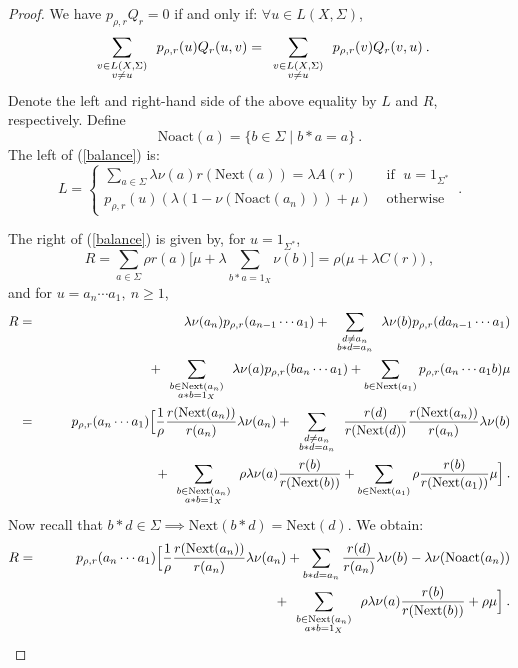 \documentclass[11pt,a4paper]{article}
\newcommand{\bdl}[2]
{\mbox{$
\renewcommand{\arraystretch}{0.5}
\begin{array}{c}{\scriptstyle #1}\\ {\scriptstyle #2} \end{array}
\renewcommand{\arraystretch}{2}
       $}}
\theoremstyle{remark}
\def\rig{\text{Next}}
\def\Noact{\text{Noact}}
\def\lef{\text{Next}}
\begin{document}
\begin{proof}
We have $p_{\rho,r} Q_r=0$ if and only if: $\forall u \in
L(X,\Sigma)$,
\begin{equation}\label{balance}
\sum_{\bdl{v\in L(X,\Sigma)}{v\neq u}} p_{\rho,r}(u) Q_r(u,v) =
\sum_{\bdl{v\in L(X,\Sigma)}{v\neq u}} p_{\rho,r}(v) Q_r(v,u) \:.
\end{equation}
Denote the left and right-hand side of the above equality by $L$
and $R$, respectively. Define
$$\Noact(a)=\{b \in \Sigma \mid b*a = a\} \ .$$
The left of (\ref{balance}) is:
\begin{equation}L=
\left\{\begin{array}{ll}
\sum_{a\in \Sigma}\lambda \nu(a) r(\rig(a))= \lambda A(r)\; & \text{if } \; u=1_{\Sigma^*} \\
p_{\rho,r}(u)(\lambda(1-\nu(\Noact(a_n))) + \mu) \; &
\mbox{otherwise }
\end{array}\right. \:.
\end{equation}

The right of (\ref{balance}) is given by, for $u=1_{\Sigma^*}$,
\begin{equation}
R = \sum_{a \in \Sigma} \rho r(a) \bigl[ \mu + \lambda \sum_{b\ast
a =1_X} \nu(b) \bigr] = \rho \bigl( \mu  + \lambda C(r) \bigr)\:,
\end{equation}
and for $u=a_n\cdots a_1, \ n\geq 1$,
\begin{eqnarray*}
R & = & \lambda \nu(a_n) p_{\rho,r}(a_{n-1}\cdots a_1) +
\sum_{\bdl {d \neq a_n}{b\ast d =a_n}}
\lambda \nu(b) p_{\rho,r}(da_{n-1}\cdots a_1) \\
&& \hspace*{0cm} + \sum_{\bdl {b\in \lef(a_n)}{a\ast b=1_X}}
\lambda \nu(a)p_{\rho,r}(ba_{n}\cdots a_1) + \sum_{b\in\rig(a_1)}
p_{\rho,r}(a_{n}\cdots a_1b)\mu \\
& = & p_{\rho,r}(a_n\cdots a_1) \Bigl[ \frac{1}{\rho}\frac
{r(\rig(a_n))}{r(a_n)}\lambda\nu(a_n) + \sum_{ \bdl {d\neq a_n}{b
\ast d=a_n}} \frac{r(d)}{r(\rig(d))}
\frac{r(\rig(a_n))}{r(a_n)} \lambda \nu(b) \Bigr. \\
&& \hspace*{3cm} \Bigl. + \sum_{\bdl{b\in \lef(a_n)}{a\ast b=1_X}}
\rho \lambda\nu(a) \frac {r(b)}{r(\rig(b))} + \sum_{b \in
\rig(a_1)} \rho \frac{r(b)}{r(\rig(a_1))} \mu \Bigr]\:.
\end{eqnarray*}
Now recall that  $b\ast d\in \Sigma \implies \rig(b*d)=\rig(d)$.
We obtain:
\begin{eqnarray*}
R & = & p_{\rho,r}(a_n\cdots a_1) \Bigl[ \frac{1}{\rho}\frac
{r(\rig(a_n))}{r(a_n)}\lambda\nu(a_n) + \sum_{b \ast d=a_n}
\frac{r(d)}{r(a_n)} \lambda
\nu(b) - \lambda\nu(\Noact(a_n)) \Bigr. \\
&& \hspace*{6cm} \Bigl. + \sum_{\bdl{b\in \lef(a_n)}{a\ast b=1_X}}
\rho \lambda\nu(a)\frac {r(b)}{r(\rig(b))} + \rho\mu \Bigr]\:.
\end{eqnarray*}


\end{proof}
\end{document}

